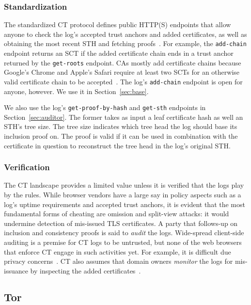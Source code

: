 \subsubsection{Standardization}
The standardized CT protocol defines public HTTP(S) endpoints that allow anyone
to check the log's accepted trust anchors and added certificates, as well as
obtaining the most recent STH and fetching proofs~\cite{ct,ct/bis}.  For
example, the \texttt{add-chain} endpoint returns an SCT if the added
certificate chain ends in a trust anchor returned by the \texttt{get-roots}
endpoint.  CAs mostly add certificate chains because Google's Chrome and
Apple's Safari require at least two SCTs for an otherwise valid certificate
chain to be accepted~\cite{chrome-policy,safari-policy}.  The log's
\texttt{add-chain} endpoint is open for anyone, however.  We use it in
Section~\ref{sec:base}.

We also use the log's \texttt{get-proof-by-hash} and \texttt{get-sth} endpoints
in Section~\ref{sec:auditor}.  The former takes as input a leaf certificate hash
as well an STH's tree size.  The tree size indicates which tree head the log
should base its inclusion proof on.  The proof is valid if it can be used in
combination with the certificate in question to reconstruct the tree head in the
log's original STH.

\subsubsection{Verification}
The CT landscape provides a limited value unless it is verified that the logs
play by the rules.  While browser vendors have a large say in policy aspects
such as a log's uptime requirements and accepted trust anchors, it is evident
that the most fundamental forms of cheating are omission and split-view
attacks:
	it would undermine detection of mis-issued TLS certificates.
A party that follows-up on inclusion and consistency proofs is said to
\emph{audit} the logs.  Wide-spread client-side auditing is a premise for CT
logs to be untrusted, but none of the web browsers that enforce CT
engage in such activities yet.  For example, it is difficult due privacy
concerns~\cite{ct-with-privacy}.  CT also assumes that domain owners
\emph{monitor} the logs for mis-issuance by inspecting the added
certificates~\cite{lwm,ct-monitors}.

\subsection{Tor} \label{sec:background:tor}


